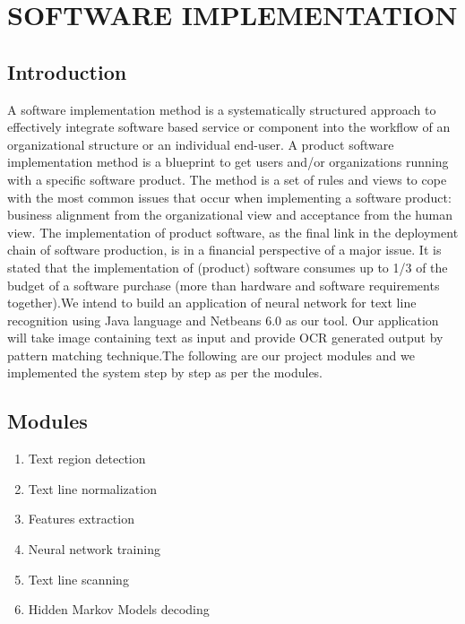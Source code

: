 \chapter{SOFTWARE IMPLEMENTATION}
\section{Introduction}
A software implementation method is a systematically structured approach to effectively integrate software based service or component into the workflow of an organizational structure or an individual end-user. A product software implementation method is a blueprint to get users and/or organizations running with a specific software product. The method is a set of rules and views to cope with the most common issues that occur when implementing a software product: business alignment from the organizational view and acceptance from the human view. The implementation of product software, as the final link in the deployment chain of software production, is in a financial perspective of a major issue. It is stated that the implementation of (product) software consumes up to 1/3 of the budget of a software purchase (more than hardware and software requirements together).We intend to build an application of neural network for text line recognition using Java language and Netbeans 6.0 as our tool. Our application will take image containing text as input and provide OCR generated output by pattern matching technique.The following are our project modules and we implemented the system step by step as per the modules.
\section{ Modules}
\begin{enumerate}
\item Text region detection
\item Text line normalization
\item Features extraction
\item Neural network training
\item Text line scanning
\item Hidden Markov Models decoding
\end{enumerate}
